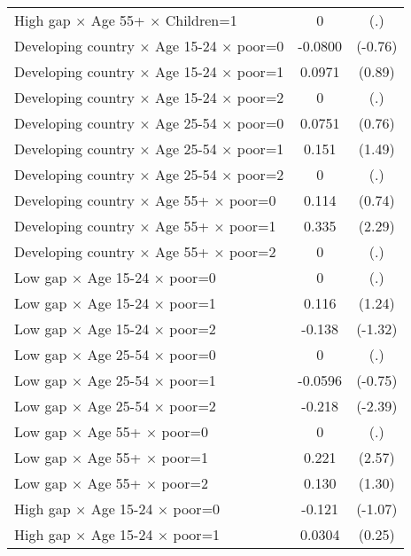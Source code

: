 {\begin{longtable}{l*{1}{cc}}
High gap $\times$ Age 55+ $\times$ Children=1&           0         &         (.)\\
Developing country $\times$ Age 15-24 $\times$ poor=0&     -0.0800         &     (-0.76)\\
Developing country $\times$ Age 15-24 $\times$ poor=1&      0.0971         &      (0.89)\\
Developing country $\times$ Age 15-24 $\times$ poor=2&           0         &         (.)\\
Developing country $\times$ Age 25-54 $\times$ poor=0&      0.0751         &      (0.76)\\
Developing country $\times$ Age 25-54 $\times$ poor=1&       0.151         &      (1.49)\\
Developing country $\times$ Age 25-54 $\times$ poor=2&           0         &         (.)\\
Developing country $\times$ Age 55+ $\times$ poor=0&       0.114         &      (0.74)\\
Developing country $\times$ Age 55+ $\times$ poor=1&       0.335\sym{*}  &      (2.29)\\
Developing country $\times$ Age 55+ $\times$ poor=2&           0         &         (.)\\
Low gap $\times$ Age 15-24 $\times$ poor=0&           0         &         (.)\\
Low gap $\times$ Age 15-24 $\times$ poor=1&       0.116         &      (1.24)\\
Low gap $\times$ Age 15-24 $\times$ poor=2&      -0.138         &     (-1.32)\\
Low gap $\times$ Age 25-54 $\times$ poor=0&           0         &         (.)\\
Low gap $\times$ Age 25-54 $\times$ poor=1&     -0.0596         &     (-0.75)\\
Low gap $\times$ Age 25-54 $\times$ poor=2&      -0.218\sym{*}  &     (-2.39)\\
Low gap $\times$ Age 55+ $\times$ poor=0&           0         &         (.)\\
Low gap $\times$ Age 55+ $\times$ poor=1&       0.221\sym{*}  &      (2.57)\\
Low gap $\times$ Age 55+ $\times$ poor=2&       0.130         &      (1.30)\\
High gap $\times$ Age 15-24 $\times$ poor=0&      -0.121         &     (-1.07)\\
High gap $\times$ Age 15-24 $\times$ poor=1&      0.0304         &      (0.25)\\

\end{longtable}}
